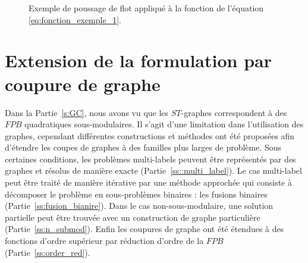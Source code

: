 \documentclass[../main/These_Mathias_Paget.tex]{subfiles}
\begin{document}
\begin{figure}[h!]
{}
\hfill
{}
\caption{Exemple de poussage de flot appliqué à la fonction de l’équation \ref{eq:fonction_exemple_1}.}
\label{sf:maxflow_exemple}
\end{figure}

\section{Extension de la formulation par coupure de graphe}
\label{s:GC_ext}

Dans la Partie~\ref{s:GC}, nous avons vu que les $ST$-graphes correspondent à des $FPB$ quadratiques sous-modulaires. Il s'agit d'une limitation dans l'utilisation des graphes, cependant différentes constructions et méthodes ont été proposées afin d'étendre les coupes de graphes à des familles plus larges de problème. Sous certaines conditions, les problèmes multi-labels peuvent être représentés par des graphes et résolus de manière exacte (Partie~\ref{ss::multi_label}). Le cas multi-label peut être traité de manière itérative par une méthode approchée qui consiste à décomposer le problème en sous-problèmes binaires : les fusions binaires (Partie~\ref{ss:fusion_bianire}). Dans le cas non-sous-modulaire, une solution partielle peut être trouvée avec un construction de graphe particulière (Partie~\ref{ss:n_submod}). Enfin les coupures de graphe ont été étendues à des fonctions d'ordre supérieur par réduction d'ordre de la $FPB$ (Partie~\ref{ss:order_red}).
\end{document}
